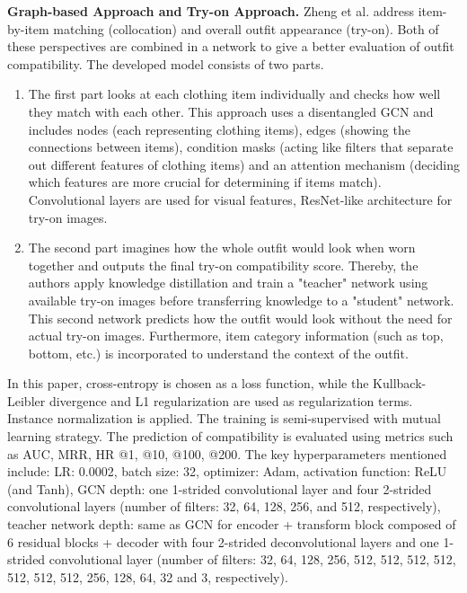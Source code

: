 \textbf{Graph-based Approach and Try-on Approach.}
Zheng et al. address item-by-item matching (collocation) and overall outfit appearance (try-on). Both of these perspectives are combined in a network to give a better evaluation of outfit compatibility. The developed model consists of two parts. \cite[vgl.]{zheng_collocation_2021}
\begin{enumerate}
  \item The first part looks at each clothing item individually and checks how well they match with each other. This approach uses a disentangled \acs{GCN} and includes nodes (each representing clothing items), edges (showing the connections between items), condition masks (acting like filters that separate out different features of clothing items) and an attention mechanism (deciding which features are more crucial for determining if items match). Convolutional layers are used for visual features, \acs{ResNet}-like architecture for try-on images. 
  \item The second part imagines how the whole outfit would look when worn together and outputs the final try-on compatibility score. Thereby, the authors apply knowledge distillation and train a "teacher" network using available try-on images before transferring knowledge to a "student" network. This second network predicts how the outfit would look without the need for actual try-on images. Furthermore, item category information (such as top, bottom, etc.) is incorporated to understand the context of the outfit.
\end{enumerate}
In this paper, cross-entropy is chosen as a loss function, while the Kullback-Leibler divergence and L1 regularization are used as regularization terms. Instance normalization is applied. The training is semi-supervised with mutual learning strategy. The prediction of compatibility is evaluated using metrics such as \acs{AUC}, \acs{MRR}, \acs{HR} @1, @10, @100, @200. The key hyperparameters mentioned include: \acs{LR}: 0.0002, batch size: 32, optimizer: Adam, activation function: \acs{ReLU} (and Tanh), \acs{GCN} depth: one 1-strided convolutional layer and four 2-strided convolutional layers (number of filters: 32, 64, 128, 256, and 512, respectively), teacher network depth: same as \acs{GCN} for encoder + transform block composed of 6 residual blocks + decoder with four 2-strided deconvolutional layers and one 1-strided convolutional layer (number of filters: 32, 64, 128, 256, 512, 512, 512, 512, 512, 512, 512, 256, 128, 64, 32 and 3, respectively). \cite[vgl.]{zheng_collocation_2021}

